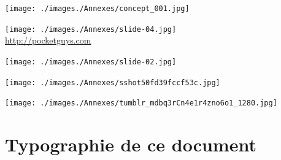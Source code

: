 \begin{minipage}{.49\textwidth}
\texttt{[image: ./images./Annexes/concept\_001.jpg]}
\\[-1mm]
\end{minipage}
\hspace{.02\textwidth}
\begin{minipage}{.49\textwidth}
\texttt{[image: ./images./Annexes/slide-04.jpg]}
\\[-1mm]
\url{http://pocketguys.com}
\end{minipage}

\begin{minipage}{\textwidth}
	\begin{minipage}[c]{.49\textwidth}
	\texttt{[image: ./images./Annexes/slide-02.jpg]}
	\\[-1mm]
	
	\vspace{2mm}
	
	\texttt{[image: ./images./Annexes/sshot50fd39fccf53c.jpg]}
	\\[-1mm]
	\end{minipage}
	\hspace{.02\textwidth}
	\begin{minipage}[c]{.49\textwidth}
	\texttt{[image: ./images./Annexes/tumblr\_mdbq3rCn4e1r4zno6o1\_1280.jpg]}
	\\[-1mm]
	\end{minipage}

\end{minipage}



\chapter{Typographie de ce document}

